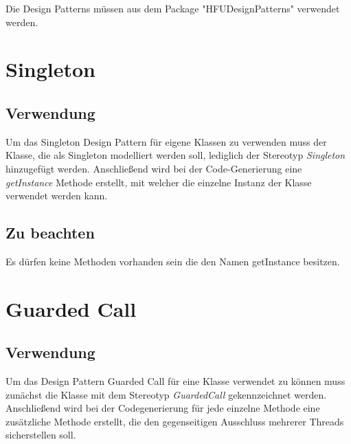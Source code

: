 Die Design Patterns müssen aus dem Package "HFUDesignPatterns" verwendet werden.

\section{Singleton}

\subsection{Verwendung}

Um das Singleton Design Pattern für eigene Klassen zu verwenden muss der Klasse, die als Singleton modelliert werden soll, lediglich der Stereotyp \textit{Singleton} hinzugefügt werden. Anschließend wird bei der Code-Generierung eine \textit{getInstance} Methode erstellt, mit welcher die einzelne Instanz der Klasse verwendet werden kann.

\subsection{Zu beachten}

Es dürfen keine Methoden vorhanden sein die den Namen getInstance besitzen.\\


\section{Guarded Call}

\subsection{Verwendung}
Um das Design Pattern Guarded Call für eine Klasse verwendet zu können muss zunächst die Klasse mit dem Stereotyp \textit{GuardedCall} gekennzeichnet werden. Anschließend wird bei der Codegenerierung für jede einzelne Methode eine zusätzliche Methode erstellt, die den gegenseitigen Ausschluss mehrerer Threads sicherstellen soll.

